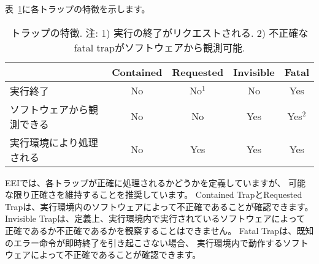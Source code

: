 表~\ref{table:trapcharacteristics}に各トラップの特徴を示します。

\begin{table}[hbt]
  \centering
  \begin{tabular}{|l|c|c|c|c|}
      \hline
      & Contained & Requested & Invisible & Fatal\\
      \hline
      実行終了             & No & No$^{1}$ & No  & Yes \\
      ソフトウェアから観測できる  & No & No       & Yes & Yes$^{2}$ \\
      実行環境により処理される & No & Yes      & Yes & Yes \\
      \hline
  \end{tabular}
  \caption{トラップの特徴. 注: 1) 実行の終了がリクエストされる. 2) 不正確なfatal trapがソフトウェアから観測可能.}
\label{table:trapcharacteristics}
\end{table}

\begin{comment}
The EEI defines for each trap whether it is handled precisely, though
the recommendation is to maintain preciseness where possible.
Contained and requested traps can be observed to be imprecise by
software inside the execution environment.  Invisible traps, by
definition, cannot be observed to be precise or imprecise by software
running inside the execution environment.  Fatal traps can be observed
to be imprecise by software running inside the execution environment,
if known-errorful instructions do not cause immediate termination.

Because this document describes unprivileged instructions, traps are
rarely mentioned.  Architectural means to handle contained traps are
defined in the privileged architecture manual, along with other
features to support richer EEIs.  Unprivileged instructions that are
defined solely to cause requested traps are documented here.
Invisible traps are, by their nature, out of scope for this document.
Instruction encodings that are not defined here and not defined by
some other means may cause a fatal trap.
\end{comment}

EEIでは、各トラップが正確に処理されるかどうかを定義していますが、
可能な限り正確さを維持することを推奨しています。
Contained TrapとRequested Trapは、実行環境内のソフトウェアによって不正確であることが確認できます。
Invisible Trapは、定義上、実行環境内で実行されているソフトウェアによって
正確であるか不正確であるかを観察することはできません。 Fatal Trapは、既知のエラー命令が即時終了を引き起こさない場合、
実行環境内で動作するソフトウェアによって不正確であることが確認できます。

